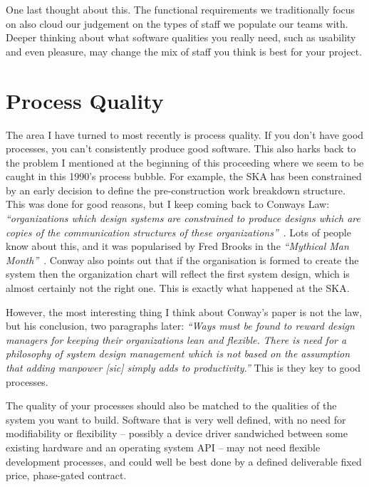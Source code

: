 \documentclass[11pt,twoside]{article}
\begin{document}
One last thought about this. The functional requirements we traditionally focus on 
also cloud our judgement on the types of staff 
we populate our teams with. Deeper 
thinking about what software qualities you really need, such as usability and even pleasure, 
may change the mix of staff you think is best for your project. 

\section{Process Quality} %
\label{sec:process_quality}
The area I have turned to most recently is process quality. If you don't have good 
processes, you can't consistently produce good software. This also harks back to the 
problem I mentioned at the beginning of this proceeding where we seem to be caught in this 
1990's process bubble. For example, the SKA has been constrained by an early decision 
to define the pre-construction work breakdown structure. This was done for good reasons,
but I keep coming back to Conways Law: \emph{``organizations which design systems \hellip 
are constrained to produce designs which are copies of the communication structures 
of these organizations''}~\citep{conway1968}. Lots of people know about this, and it was 
popularised by Fred Brooks in the \emph{``Mythical Man Month''}~\citep{brooks1995}. Conway also 
points out that if the organisation is formed to create the system then the organization 
chart will reflect the first system design, which is almost certainly not the right one. 
This is exactly what happened at the SKA.

However, the most interesting thing I think about Conway's paper is not the law, 
but his conclusion, two paragraphs later: \emph{``Ways must be found to reward design managers for keeping 
their organizations lean and flexible. There is need for a philosophy 
of system design management which is not based on the assumption that adding manpower [sic] simply adds to productivity.''}
This is they key to good processes. 

The quality of your processes should also be matched to the qualities of the system 
you want to build. Software that is very well defined, with no need for modifiability or 
flexibility -- possibly a device driver sandwiched between some existing hardware and 
an operating system API -- may not need flexible development processes, and could 
well be best done by a defined deliverable fixed price, phase-gated contract. 
\end{document}
